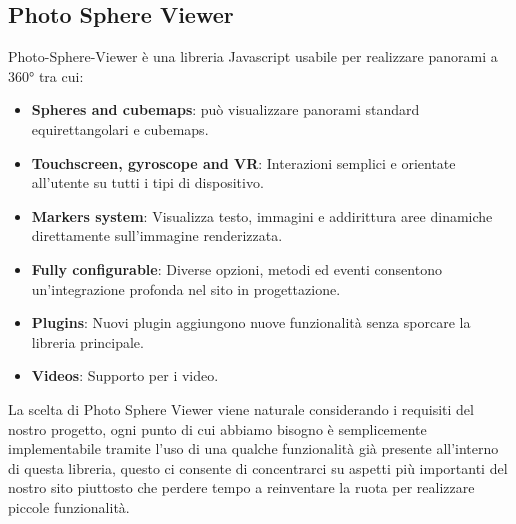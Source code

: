 \documentclass{article}
\begin{document}
\subsection{Photo Sphere Viewer}
Photo-Sphere-Viewer\cite{photo-sphere-viewer} è una libreria Javascript usabile per realizzare panorami a 360° tra cui:
\begin{itemize}
	\item \textbf{Spheres and cubemaps}: può visualizzare panorami standard equirettangolari e cubemaps.
	\item \textbf{Touchscreen, gyroscope and VR}: Interazioni semplici e orientate all'utente su tutti i tipi di dispositivo.
	\item \textbf{Markers system}: Visualizza testo, immagini e addirittura aree dinamiche direttamente sull'immagine renderizzata.
	\item \textbf{Fully configurable}: Diverse opzioni, metodi ed eventi consentono un'integrazione profonda nel sito in progettazione.
	\item \textbf{Plugins}: Nuovi plugin aggiungono nuove funzionalità senza sporcare la libreria principale.
	\item \textbf{Videos}: Supporto per i video.
\end{itemize}
La scelta di Photo Sphere Viewer viene naturale considerando i requisiti del nostro progetto, ogni punto di cui abbiamo bisogno è semplicemente implementabile tramite l'uso di una qualche funzionalità già presente all'interno di questa libreria, questo ci consente di concentrarci su aspetti più importanti del nostro sito piuttosto che perdere tempo a reinventare la ruota per realizzare piccole funzionalità.
\end{document}
